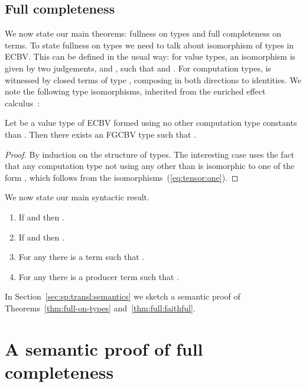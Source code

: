 \documentclass{LMCS}
\newcommand{\EECstate}{\underline{\mathrm{S}}}
\newcommand{\svar}s
\newcommand{\FGCBV}{FGCBV}
\newcommand{\ECBV}{ECBV}
\newcommand{\CBVtoEEC}[1]{#1^{\circ}}
\newcommand{\CBVtoEECbase}[2]{#2^{#1}}
\begin{document}
\subsection{Full completeness}
We now state our main theorems: fullness on types and full completeness
on terms.
To state fullness on types we need to talk about isomorphism of types in {\ECBV}. 
This can be defined in the usual way: for
value types, an isomorphism  is given by two judgements,
 and , such that
 and . For computation types,  is
witnessed by closed terms of type , 
composing in both directions to identities. 
We note the following type isomorphisms, inherited from 
the enriched effect calculus~\cite[\S 3]{Mogelberg:CSL:09}:


\begin{thm}
\label{thm:full-on-types}
Let  be a value type of {\ECBV} formed using no other computation type constants than . Then there exists an {\FGCBV} type  such that .
\end{thm}

\begin{proof}
By induction on the structure of types. The interesting case  uses the fact that any computation type not using any  other than  is isomorphic to one of the form , which follows from the isomorphisms~(\ref{eq:tensor:one}). 
\end{proof}
\noindent
We now state our main syntactic result.
\renewcommand{\CBVtoEEC}{\CBVtoEECbase\EECstate}
\renewcommand{\CBVtoEECV}{\CBVtoEECbase \EECstate}
\renewcommand{\CBVtoEECP}[1]{\CBVtoEECbase \EECstate{#1}_\svar}
\begin{thm} \label{thm:full:faithful}\mbox{}
\begin{enumerate}
\item \label{item:faithful:values} 
If  
and  
then .
\item
If   and 
 then 
.
\item For any  there is a term  such that . 
\item For any  there is a producer term  such that 
.
\end{enumerate}
\end{thm}
\noindent In Section~\ref{sec:sp:transl:semantics} we sketch a semantic proof of Theorems~\ref{thm:full-on-types} and~\ref{thm:full:faithful}.






\section{A semantic proof of full completeness}
\label{sec:relating:models}
\end{document}
